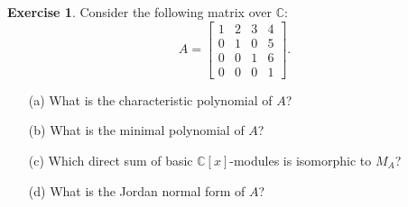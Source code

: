 \documentclass{amsart}
\newcommand{\bbm}       {\left[\begin{matrix}}
\newcommand{\ebm}       {\end{matrix}\right]}
\newcommand{\C}         {{\mathbb{C}}}
\newcommand{\ip}[1]     {\langle #1\rangle}
\renewcommand{\:}{\colon}
\theoremstyle{definition}
\newtheorem{exercise}{Exercise}[section]
\begin{document}
\begin{exercise}
 Consider the following matrix over $\C$: 
 \[ A = \bbm 1&2&3&4 \\ 0&1&0&5 \\ 0&0&1&6 \\ 0&0&0&1 \ebm.  \]
 \begin{itemize}
  \item[(a)] What is the characteristic polynomial of $A$?
  \item[(b)] What is the minimal polynomial of $A$?
  \item[(c)] Which direct sum of basic $\C[x]$-modules is isomorphic
   to $M_A$?
  \item[(d)] What is the Jordan normal form of $A$?
 \end{itemize}
\end{exercise}
\end{document}
